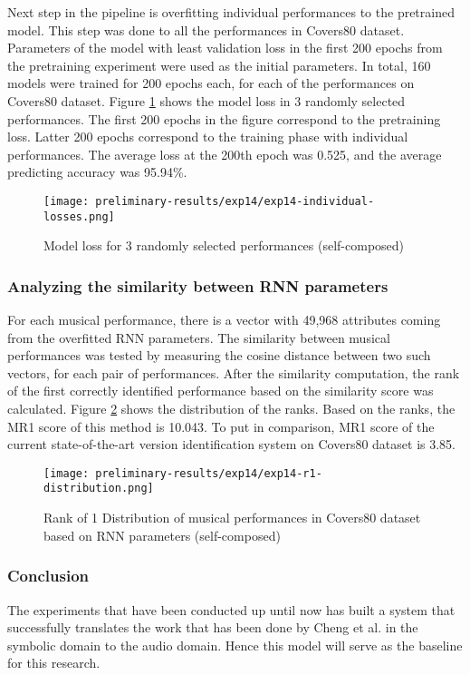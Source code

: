\documentclass[../main.tex]{subfiles}
\begin{document}
\par
Next step in the pipeline is overfitting individual performances to the pretrained model. This step was done to all the performances in Covers80 dataset. Parameters of the model with least validation loss in the first 200 epochs from the pretraining experiment were used as the initial parameters. In total, 160 models were trained for 200 epochs each, for each of the performances on Covers80 dataset. Figure \ref{fig:exp14-performance} shows the model loss in 3 randomly selected performances. The first 200 epochs in the figure correspond to the pretraining loss. Latter 200 epochs correspond to the training phase with individual performances. The average loss at the 200th epoch was 0.525, and the average predicting accuracy was 95.94\%.


\begin{figure}[H]
    \centering
    \texttt{[image: preliminary-results/exp14/exp14-individual-losses.png]}
    \caption{Model loss for 3 randomly selected performances (self-composed)}
    \label{fig:exp14-performance}
\end{figure}


\subsubsection{Analyzing the similarity between RNN parameters}

\par
For each musical performance, there is a vector with 49,968 attributes coming from the overfitted \gls{RNN} parameters. The similarity between musical performances was tested by measuring the cosine distance between two such vectors, for each pair of performances. After the similarity computation, the rank of the first correctly identified performance based on the similarity score was calculated. Figure \ref{fig:exp14-r1-distribution} shows the distribution of the ranks. Based on the ranks, the \gls{MR1} score of this method is 10.043. To put in comparison, \gls{MR1} score of the current state-of-the-art version identification system \cite{jiang_yang_chen_2020} on Covers80 dataset is 3.85.

\begin{figure}[H]
    \centering
    \texttt{[image: preliminary-results/exp14/exp14-r1-distribution.png]}
    \caption{Rank of 1 Distribution of musical performances in Covers80 dataset based on RNN parameters (self-composed)}
    \label{fig:exp14-r1-distribution}
\end{figure}

\subsubsection{Conclusion}

\par
The experiments that have been conducted up until now has built a system that successfully translates the work that has been done by Cheng et al. in the symbolic domain \cite{tian_cheng_comparing_2018} to the audio domain. Hence this model will serve as the baseline for this research.
\end{document}
